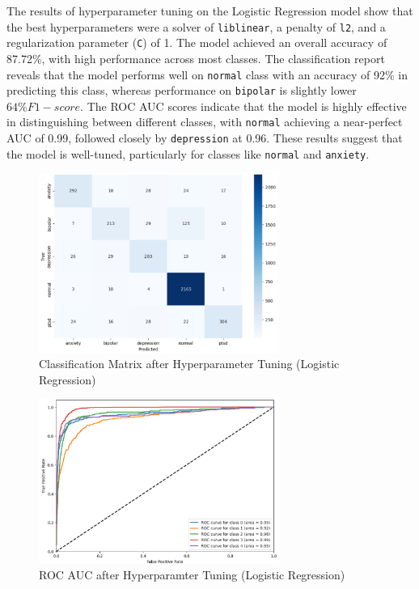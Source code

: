 \noindent
The results of hyperparameter tuning on the Logistic Regression model show that the best hyperparameters were a solver of \texttt{liblinear}, a penalty of \texttt{l2}, and a regularization parameter (\texttt{C}) of 1. The model achieved an overall accuracy of 87.72\%, with high performance across most classes. The classification report reveals that the model performs well on \texttt{normal} class with an accuracy of 92\% in predicting this class, whereas performance on \texttt{bipolar} is slightly lower \(64\% F1-score\). The ROC AUC scores indicate that the model is highly effective in distinguishing between different classes, with \texttt{normal} achieving a near-perfect AUC of 0.99, followed closely by \texttt{depression} at 0.96. These results suggest that the model is well-tuned, particularly for classes like \texttt{normal} and \texttt{anxiety}.

\begin{figure}[h!]  
    \centering
    \includegraphics[width=0.7\textwidth]{Images/HP LR CM.png}  
    \caption{Classification Matrix after Hyperparameter Tuning (Logistic Regression)}
    \label{LSTMROC2}  %
\end{figure}

\begin{figure}[h!]  
    \centering
    \includegraphics[width=0.7\textwidth]{Images/HP LR ROC.png}  
    \caption{ROC AUC after Hyperparamter Tuning (Logistic Regression)}
    \label{LSTMROC3}  %
\end{figure}



